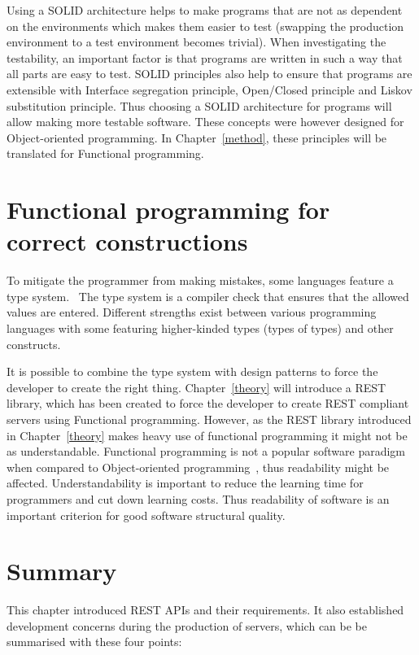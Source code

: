 Using a SOLID architecture helps to make programs that are not as dependent on
the environments which makes them easier to test (swapping the production
environment to a test environment becomes trivial). When investigating the
testability, an important factor is that programs are written in such a way
that all parts are easy to test. SOLID principles also help to ensure that
programs are extensible with Interface segregation principle, Open/Closed
principle and Liskov substitution principle. Thus choosing a SOLID architecture
for programs will allow making more testable software. These concepts were
however designed for Object-oriented programming. In Chapter~\ref{method},
these principles will be translated for Functional programming. 

\section{Functional programming for correct constructions}

To mitigate the programmer from making mistakes, some languages feature a type
system.~\cite{cardelli1996type} The type system is a compiler check that
ensures that the allowed values are entered. Different strengths exist between
various programming languages with some featuring higher-kinded types (types of
types) and other constructs.~\cite{moors2007towards}

It is possible to combine the type system with design patterns to force the
developer to create the right thing. Chapter~\ref{theory} will introduce a REST
library, which has been created to force the developer to create REST compliant
servers using Functional programming. However, as the REST library introduced
in Chapter~\ref{theory} makes heavy use of functional programming it might not
be as understandable.  Functional programming is not a popular software
paradigm when compared to Object-oriented programming~\cite{tiobe2013tiobe},
thus readability might be affected.  Understandability is important to reduce
the learning time for programmers and cut down learning costs. Thus readability
of software is an important criterion for good software structural quality.

\section{Summary}\label{backgroundconclusion}

This chapter introduced REST APIs and their requirements.  It also established
development concerns during the production of servers, which can be be
summarised with these four points:

